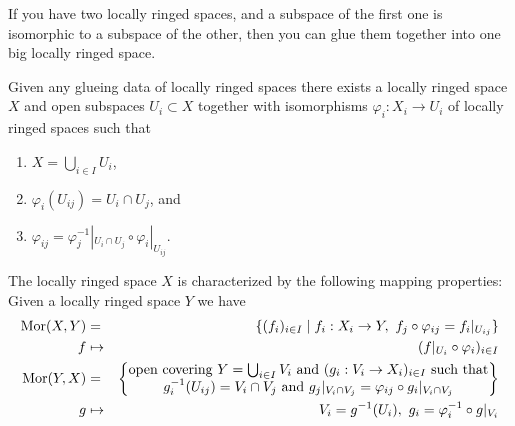 \begin{lemma}
\label{lemma-glue}
\begin{slogan}
If you have two locally ringed spaces, and a subspace of the first one
is isomorphic to a subspace of the other, then you can glue them together
into one big locally ringed space.
\end{slogan}
Given any glueing data of locally ringed spaces there
exists a locally ringed space $X$ and open subspaces
$U_i \subset X$ together with isomorphisms
$\varphi_i : X_i \to U_i$ of locally ringed spaces such that
\begin{enumerate}
\item $X=\bigcup_{i\in I} U_i$,
\item $\varphi_i(U_{ij}) = U_i \cap U_j$, and
\item $\varphi_{ij} =
\varphi_j^{-1}|_{U_i \cap U_j} \circ \varphi_i|_{U_{ij}}$.
\end{enumerate}
The locally ringed space $X$ is characterized by the following
mapping properties: Given a locally ringed space $Y$ we have
\begin{eqnarray*}
\mathop{\mathrm{Mor}}\nolimits(X, Y) & = & \{ (f_i)_{i\in I} \mid
f_i : X_i \to Y, \ f_j \circ \varphi_{ij} = f_i|_{U_{ij}}\} \\
f & \mapsto & (f|_{U_i} \circ \varphi_i)_{i \in I} \\
\mathop{\mathrm{Mor}}\nolimits(Y, X) & = &
\left\{
\begin{matrix}
\text{open covering }Y = \bigcup\nolimits_{i \in I} V_i\text{ and }
(g_i : V_i \to X_i)_{i \in I}
\text{ such that}\\
g_i^{-1}(U_{ij}) = V_i \cap V_j
\text{ and }
g_j|_{V_i \cap V_j} = \varphi_{ij} \circ g_i|_{V_i \cap V_j}
\end{matrix}
\right\} \\
g & \mapsto &
V_i = g^{-1}(U_i), \ g_i = \varphi_i^{-1} \circ g|_{V_i}
\end{eqnarray*}
\end{lemma}

